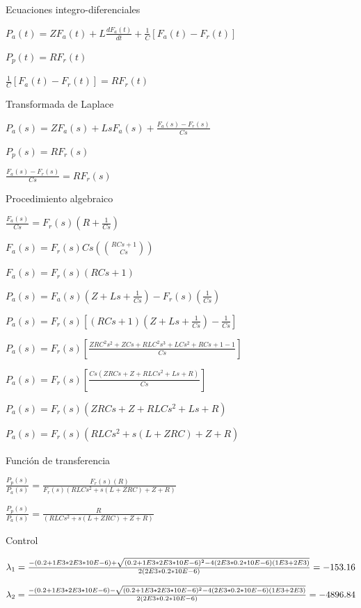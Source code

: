 \documentclass{article}
\begin{document}
Ecuaciones integro-diferenciales

$P_{a}(t) =ZF_{a}(t) +L\frac{dF_{a}(t)}{dt} +\frac{1}{C}\left [F_{a}(t)
-F_{r}(t)\right ]$

$P_{p}(t) =RF_{r}(t)$

$\frac{1}{C}\left [F_{a}(t) -F_{r}(t)\right ] =RF_{r}(t)$

Transformada de Laplace

$P_{a}(s) =ZF_{a}(s) +LsF_{a}(s) +\frac{F_{a}(s) -F_{r}(s)}{Cs}$

$P_{p}(s) =RF_{r}(s)$

$\frac{F_{a}(s) -F_{r}(s)}{Cs} =RF_{r}(s)$

Procedimiento algebraico

$\frac{F_{a}(s)}{Cs} =F_{r}(s)\left (R +\frac{1}{Cs}\right )$

$F_{a}(s) =F_{r}(s)Cs(\binom{RCs +1}{Cs})$

$F_{a}(s) =F_{r}(s)(RCs +1)$

$P_{a}(s) =F_{a}(s)(Z +Ls +\frac{1}{Cs}) -F_{r}(s)\left (\frac{1}{Cs}\right )
$

$P_{a}(s) =F_{r}(s)\left [(RCs +1)(Z +Ls +\frac{1}{Cs}) -\frac{1}{Cs}\right ]
$

$P_{a}(s) =F_{r}(s)\left [\frac{ZRC^{2}s^{2} +ZCs +RLC^{2}s^{3} +LCs^{2}
+RCs +1 -1_{}}{Cs}\right ]$

$P_{a}(s) =F_{r}(s)\left [\frac{Cs(ZRCs +Z +RLCs^{2} +Ls +R)_{}}{Cs}\right ]$

$P_{a}(s) =F_{r}(s)(ZRCs +Z +RLCs^{2} +Ls +R)$

$P_{a}(s) =F_{r}(s)(RLCs^{2} +s(L +ZRC) +Z +R)_{}$

Funci{\'o}n de transferencia

$\frac{P_{p}(s)}{P_{a}(s)} =\frac{F_{r}(s)(R)}{F_{r}(s)(RLCs^{2} +s(L +ZRC)
+Z +R)_{}}$

$\frac{P_{p}(s)}{P_{a}(s)} =\frac{R}{(RLCs^{2} +s(L +ZRC) +Z +R)_{}}$

Control

$\lambda _{1} =\frac{ -\left (0.2 +1E3 \ast 2E3 \ast 10E -6\right ) +\sqrt{%
(0.2 +1E3 \ast 2E3 \ast 10E -6)^{2} -4\left (2E3 \ast 0.2 \ast 10E -6\right
)\left (1E3 +2E3\right )}}{2\left (2E3 \ast 0.2 \ast 10E -6\right )} =
-153.16$

$\lambda _{2} =\frac{ -\left (0.2 +1E3 \ast 2E3 \ast 10E -6\right ) -\sqrt{%
(0.2 +1E3 \ast 2E3 \ast 10E -6)^{2} -4\left (2E3 \ast 0.2 \ast 10E -6\right
)\left (1E3 +2E3\right )}}{2\left (2E3 \ast 0.2 \ast 10E -6\right )} =
-4896.84$
\end{document}
